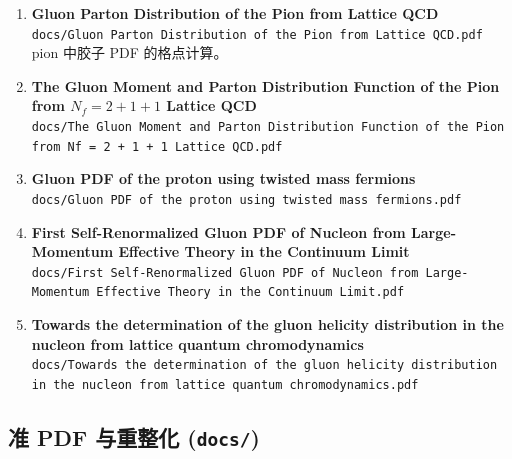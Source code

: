 \documentclass[12pt,a4paper]{ctexart}
\begin{document}
\begin{enumerate}
    \item \textbf{Gluon Parton Distribution of the Pion from Lattice QCD} \\
    \texttt{docs/Gluon Parton Distribution of the Pion from Lattice QCD.pdf} \\
     pion 中胶子 PDF 的格点计算。

    \item \textbf{The Gluon Moment and Parton Distribution Function of the Pion from $N_f = 2 + 1 + 1$ Lattice QCD} \\
    \texttt{docs/The Gluon Moment and Parton Distribution Function of the Pion from Nf = 2 + 1 + 1 Lattice QCD.pdf}

    \item \textbf{Gluon PDF of the proton using twisted mass fermions} \\
    \texttt{docs/Gluon PDF of the proton using twisted mass fermions.pdf}

    \item \textbf{First Self-Renormalized Gluon PDF of Nucleon from Large-Momentum Effective Theory in the Continuum Limit} \\
    \texttt{docs/First Self-Renormalized Gluon PDF of Nucleon from Large-Momentum Effective Theory in the Continuum Limit.pdf}

    \item \textbf{Towards the determination of the gluon helicity distribution in the nucleon from lattice quantum chromodynamics} \\
    \texttt{docs/Towards the determination of the gluon helicity distribution in the nucleon from lattice quantum chromodynamics.pdf}
\end{enumerate}

\subsection{准 PDF 与重整化 (\texttt{docs/})}
\end{document}
